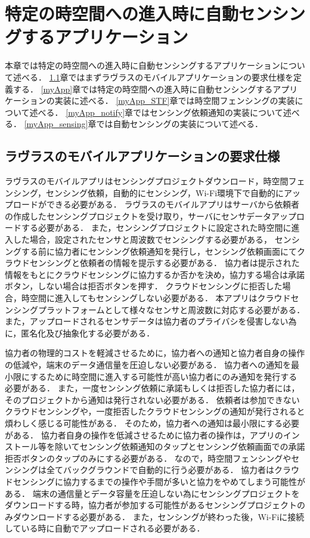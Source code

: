 \chapter{特定の時空間への進入時に自動センシングするアプリケーション}
\thispagestyle{myheadings}
本章では特定の時空間への進入時に自動センシングするアプリケーションについて述べる．
\ref{lavlusReq}章ではまずラヴラスのモバイルアプリケーションの要求仕様を定義する．
\ref{myApp}章では特定の時空間への進入時に自動センシングするアプリケーションの実装に述べる．
\ref{myApp_STF}章では時空間フェンシングの実装について述べる．
\ref{myApp_notify}章ではセンシング依頼通知の実装について述べる．
\ref{myApp_sensing}章では自動センシングの実装について述べる．


\section{ラヴラスのモバイルアプリケーションの要求仕様}
\label{lavlusReq}
ラヴラスのモバイルアプリはセンシングプロジェクトダウンロード，時空間フェンシング，センシング依頼，自動的にセンシング，Wi-Fi環境下で自動的にアップロードができる必要がある．
ラヴラスのモバイルアプリはサーバから依頼者の作成したセンシングプロジェクトを受け取り，サーバにセンサデータアップロードする必要がある．
また，センシングプロジェクトに設定された時空間に進入した場合，設定されたセンサと周波数でセンシングする必要がある，
センシングする前に協力者にセンシング依頼通知を発行し，センシング依頼画面にてクラウドセンシングと依頼者の情報を提示する必要がある．
協力者は提示された情報をもとにクラウドセンシングに協力するか否かを決め，協力する場合は承諾ボタン，しない場合は拒否ボタンを押す．
クラウドセンシングに拒否した場合，時空間に進入してもセンシングしない必要がある．
本アプリはクラウドセンシングプラットフォームとして様々なセンサと周波数に対応する必要がある．
また，アップロードされるセンサデータは協力者のプライバシを侵害しない為に，匿名化及び抽象化する必要がある．

協力者の物理的コストを軽減させるために，協力者への通知と協力者自身の操作の低減や，端末のデータ通信量を圧迫しない必要がある．
協力者への通知を最小限にするために時空間に進入する可能性が高い協力者にのみ通知を発行する必要がある．
また，一度センシング依頼に承諾もしくは拒否した協力者には，そのプロジェクトから通知は発行されない必要がある．
依頼者は参加できないクラウドセンシングや，一度拒否したクラウドセンシングの通知が発行されると煩わしく感じる可能性がある．
そのため，協力者への通知は最小限にする必要がある．
協力者自身の操作を低減させるために協力者の操作は，アプリのインストール等を除いてセンシング依頼通知のタップとセンシング依頼画面での承諾拒否ボタンのタップのみにする必要がある．
なので，時空間フェンシングやセンシングは全てバックグラウンドで自動的に行う必要がある．
協力者はクラウドセンシングに協力するまでの操作や手間が多いと協力をやめてしまう可能性がある．
端末の通信量とデータ容量を圧迫しない為にセンシングプロジェクトをダウンロードする時，協力者が参加する可能性があるセンシングプロジェクトのみダウンロードする必要がある．
また，センシングが終わった後，Wi-Fiに接続している時に自動でアップロードされる必要がある．

